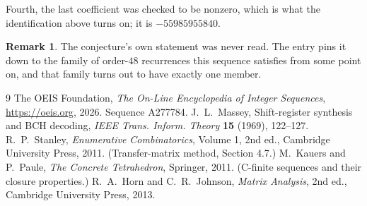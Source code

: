 \documentclass[11pt,a4paper]{article}
\theoremstyle{plain}
\theoremstyle{definition}
\newtheorem{remark}[theorem]{Remark}
\begin{document}
Fourth, the last coefficient was checked to be nonzero, which is what the identification above
turns on; it is $-55985955840$.

\begin{remark}
The conjecture's own statement was never read. The entry pins it down to the family of
order-$48$ recurrences this sequence satisfies from some point on, and that family turns
out to have exactly one member.
\end{remark}

\begin{thebibliography}{9}
 The OEIS Foundation, \emph{The On-Line Encyclopedia of Integer
Sequences}, \url{https://oeis.org}, 2026. Sequence A277784.
 J.~L.~Massey, Shift-register synthesis and BCH decoding, \emph{IEEE
Trans. Inform. Theory} \textbf{15} (1969), 122--127.
 R.~P.~Stanley, \emph{Enumerative Combinatorics}, Volume 1, 2nd ed.,
Cambridge University Press, 2011. (Transfer-matrix method, Section 4.7.)
 M.~Kauers and P.~Paule, \emph{The Concrete Tetrahedron}, Springer, 2011.
(C-finite sequences and their closure properties.)
 R.~A.~Horn and C.~R.~Johnson, \emph{Matrix Analysis}, 2nd ed., Cambridge
University Press, 2013.
\end{thebibliography}
\end{document}
